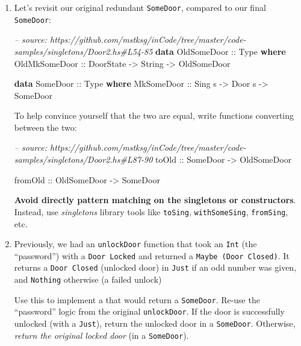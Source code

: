\documentclass[]{article}
\newenvironment{Shaded}{}{}
\newcommand{\KeywordTok}[1]{\textcolor[rgb]{0.00,0.44,0.13}{\textbf{#1}}}
\newcommand{\DataTypeTok}[1]{\textcolor[rgb]{0.56,0.13,0.00}{#1}}
\newcommand{\CommentTok}[1]{\textcolor[rgb]{0.38,0.63,0.69}{\textit{#1}}}
\newcommand{\OtherTok}[1]{\textcolor[rgb]{0.00,0.44,0.13}{#1}}
\newcommand{\NormalTok}[1]{#1}
\begin{document}
\begin{enumerate}
\def\labelenumi{\arabic{enumi}.}
\item
  Let's revisit our original redundant \texttt{SomeDoor}, compared to our final
  \texttt{SomeDoor}:

\begin{Shaded}
\begin{Highlighting}[]
\CommentTok{-- source: https://github.com/mstksg/inCode/tree/master/code-samples/singletons/Door2.hs#L54-85}
\KeywordTok{data} \DataTypeTok{OldSomeDoor}\OtherTok{ ::} \DataTypeTok{Type} \KeywordTok{where}
    \DataTypeTok{OldMkSomeDoor}\OtherTok{ ::} \DataTypeTok{DoorState} \OtherTok{->} \DataTypeTok{String} \OtherTok{->} \DataTypeTok{OldSomeDoor}

\KeywordTok{data} \DataTypeTok{SomeDoor}\OtherTok{ ::} \DataTypeTok{Type} \KeywordTok{where}
    \DataTypeTok{MkSomeDoor}\OtherTok{ ::} \DataTypeTok{Sing}\NormalTok{ s }\OtherTok{->} \DataTypeTok{Door}\NormalTok{ s }\OtherTok{->} \DataTypeTok{SomeDoor}
\end{Highlighting}
\end{Shaded}

  To help convince yourself that the two are equal, write functions converting
  between the two:

\begin{Shaded}
\begin{Highlighting}[]
\CommentTok{-- source: https://github.com/mstksg/inCode/tree/master/code-samples/singletons/Door2.hs#L87-90}
\OtherTok{toOld ::} \DataTypeTok{SomeDoor} \OtherTok{->} \DataTypeTok{OldSomeDoor}

\OtherTok{fromOld ::} \DataTypeTok{OldSomeDoor} \OtherTok{->} \DataTypeTok{SomeDoor}
\end{Highlighting}
\end{Shaded}

  \textbf{Avoid directly pattern matching on the singletons or constructors}.
  Instead, use \emph{singletons} library tools like \texttt{toSing},
  \texttt{withSomeSing}, \texttt{fromSing}, etc.
\item
  Previously, we had an \texttt{unlockDoor} function that took an \texttt{Int}
  (the ``password'') with a \texttt{Door\ \textquotesingle{}Locked} and returned
  a \texttt{Maybe\ (Door\ \textquotesingle{}Closed)}. It returns a
  \texttt{Door\ \textquotesingle{}Closed} (unlocked door) in \texttt{Just} if an
  odd number was given, and \texttt{Nothing} otherwise (a failed unlock)

  Use this to implement a that would return a \texttt{SomeDoor}. Re-use the
  ``password'' logic from the original \texttt{unlockDoor}. If the door is
  successfully unlocked (with a \texttt{Just}), return the unlocked door in a
  \texttt{SomeDoor}. Otherwise, \emph{return the original locked door} (in a
  \texttt{SomeDoor}).


\end{enumerate}
\end{document}
